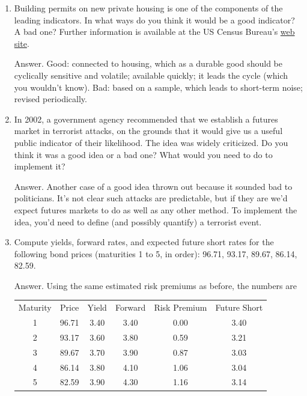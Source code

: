 \documentclass[letterpaper,12pt]{article}
\begin{document}
\begin{enumerate}

\item Building permits on new private housing is one of the
components of the leading indicators.  In what ways do you think
it would be a good indicator?  A bad one?  Further information is
available at the US Census Bureau's
\href{http://www.census.gov/const/www/newresconstindex.html}{web
site}.

Answer.  Good:  connected to housing, which as a durable good
should be cyclically sensitive and volatile; available quickly; it
leads the cycle (which you wouldn't know). Bad: based on a sample,
which leads to short-term noise; revised periodically.

\item In 2002, a government agency recommended that we establish a
futures market in terrorist attacks, on the grounds that it would
give us a useful public indicator of their likelihood.  The idea
was widely criticized.  Do you think it was a good idea or a bad
one?  What would you need to do to implement it?

Answer.  Another case of a good idea thrown out because it sounded
bad to politicians.  It's not clear such attacks are predictable,
but if they are we'd expect futures markets to do as well as any
other method.  To implement the idea, you'd need to define (and
possibly quantify) a terrorist event.

\item Compute yields, forward rates, and expected future short
rates for the following bond prices (maturities 1 to 5, in order):
96.71, 93.17, 89.67, 86.14, 82.59.

Answer.  Using the same estimated risk premiums as before, the numbers are
\begin{center}
\begin{tabular}{cccccc}
    Maturity        &     Price        &   Yield    &  Forward  &  Risk Premium & Future Short \\
     1              &      96.71   &  3.40   &  3.40  &  0.00   &  3.40 \\
     2              &      93.17   &  3.60   &  3.80  &  0.59   &  3.21 \\
     3              &      89.67   &  3.70   &  3.90  &  0.87   &  3.03 \\
     4              &      86.14   &  3.80   &  4.10  &  1.06   &  3.04 \\
     5              &      82.59   &  3.90   &  4.30  &  1.16   &  3.14
\end{tabular}
\end{center}


\end{enumerate}
\end{document}
